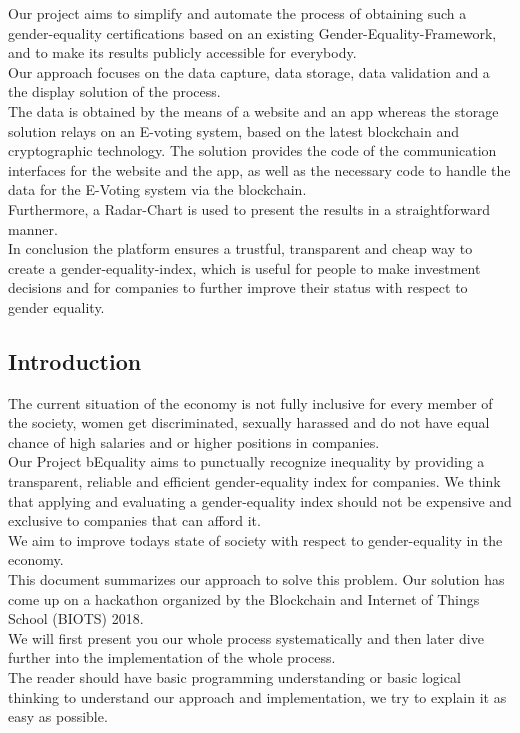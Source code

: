 \documentclass[portrait,a4paper]{article}
\begin{document}
	Our project aims to simplify and automate the process of obtaining such a gender-equality certifications 
	based on an existing Gender-Equality-Framework, and to make its results publicly accessible for everybody.\\
	Our approach focuses on the data capture, data storage, data validation and a the display solution of the process.\\
	The data is obtained by the means of a website and an app whereas the storage solution relays on an 
	E-voting system, based on the latest blockchain and cryptographic technology. The solution provides 
	the code of the communication interfaces for the website and the app, as well as the necessary code 
	to handle the data for the E-Voting system via the blockchain.\\
	Furthermore, a Radar-Chart is used to present the results in a straightforward manner.\\

	In conclusion the platform ensures a trustful, transparent and cheap way to create a gender-equality-index, 
	which is useful for people to make investment decisions and for companies to further improve their status 
	with respect to gender equality.
	
	\subsection*{Introduction}
		The current situation of the economy is not fully inclusive for every member of the society, 
		women get discriminated, sexually harassed and do not have equal chance of high salaries and 
		or higher positions in companies.\\
		Our Project bEquality aims to punctually recognize inequality by providing a transparent, 
		reliable and efficient gender-equality index for companies. We think that applying and 
		evaluating a gender-equality index should not be expensive and exclusive to companies 
		that can afford it.\\
		We aim to improve todays state of society with respect to gender-equality in the economy.\\

		This document summarizes our approach to solve this problem. Our solution has come up on a hackathon 
		organized by the Blockchain and Internet of Things School (BIOTS) 2018.\\

		We will first present you our whole process systematically and then later dive further into the 
		implementation of the whole process.\\
		The reader should have basic programming understanding or basic logical thinking to understand 
		our approach and implementation, we try to explain it as easy as possible.
\end{document}
